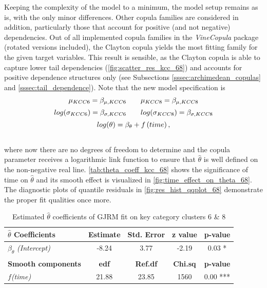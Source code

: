 Keeping the complexity of the model to a minimum, the model setup remains as is, with the only minor differences. Other copula families are considered in addition, particularly those that account for positive (and not negative) dependencies. Out of all implemented copula families in the \textit{VineCopula} package (rotated versions included), the Clayton copula yields the most fitting family for the given target variables. This result is sensible, as the Clayton copula is able to capture lower tail dependencies (\autoref{fig:scatter_res_kcc_68}) and accounts for positive dependence structures only (see Subsections \ref{sssec:archimedean_copulas} and \ref{sssec:tail_dependence}). Note that the new model specification is \\

\begin{equation}
\begin{array}{c}
\mu_{KCC 6}=\beta_{\mu,KCC6} \qquad \mu_{KCC 8}=\beta_{\mu,KCC8}  \\  \noalign{\vskip5pt}

log(\sigma_{KCC 6})=\beta_{\sigma,KCC6} \qquad log(\sigma_{KCC 8})=\beta_{\sigma,KCC8} \\  \noalign{\vskip5pt}


log(\theta)=\beta_{\theta}+f\left(time\right),
\end{array}
\label{eq:gjrm_formula_68}
\end{equation}
\\

where now there are no degrees of freedom to determine and the copula parameter receives a logarithmic link function to ensure that $\hat{\theta}$ is well defined on the non-negative real line. \autoref{tab:theta_coeff_kcc_68} shows the significance of time on $\hat{\theta}$ and its smooth effect is visualized in \autoref{fig:time_effect_on_theta_68}. The diagnostic plots of quantile residuals in \autoref{fig:res_hist_qqplot_68} demonstrate the proper fit qualities once more.
\\



\begin{table}[H]
\centering
\begin{tabular}{l|c|c|c|c}
\hline
                               \textbf{$\hat{\theta}$ Coefficients}       & \textbf{Estimate} & \textbf{Std. Error} & \textbf{z value} & \textbf{p-value}  \\ \hline\hline
$\beta_{\theta}$ \textit{(Intercept)}                  & -8.24     & 3.77       & -2.19    & 0.03 *   \\ \hline
& & & & \\ \hline
\textbf{Smooth components}            & \textbf{edf}      & \textbf{Ref.df}     & \textbf{Chi.sq}  & \textbf{p-value}  \\ \hline\hline
\textit{$f$(time)}                 & 21.88    & 23.85      & 1560   & 0.00 *** \\ \hline
\end{tabular}
\caption{Estimated $\hat{\theta}$ coefficients of \ac{GJRM} fit on key category clusters 6 \& 8}
\label{tab:theta_coeff_kcc_68}
\end{table}






